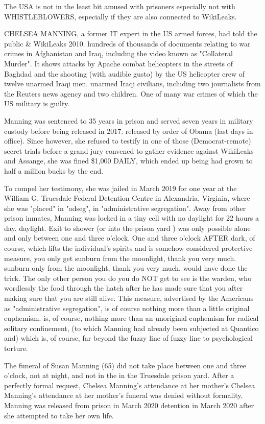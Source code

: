 \begin{multicols}{2}
The USA is not in the least bit amused with prisoners
especially not with WHISTLEBLOWERS, especially if they are also connected to WikiLeaks.

CHELSEA MANNING, a former IT expert in the US armed forces, had told the public \& WikiLeaks 2010.
hundreds of thousands of documents relating to war crimes in
Afghanistan and Iraq, including the video known as "Collateral Murder". It shows attacks by Apache combat helicopters
in the streets of Baghdad and the shooting (with audible gusto) by the US helicopter crew of twelve unarmed Iraqi men.
unarmed Iraqi civilians, including two journalists from the Reuters news agency and two children. One of many war crimes of which the US military is guilty.

Manning was sentenced to 35 years in prison and served seven years in military custody before being released in 2017.
released by order of Obama (last days in office). Since
however, she refused to testify in one of those (Democrat-remote) secret trials before a grand jury convened to gather evidence against WikiLeaks and Assange, she was fined \$1,000 DAILY, which ended up being
had grown to half a million bucks by the end.

To compel her testimony, she was jailed in March 2019
for one year at the William G. Truesdale Federal Detention
Centre in Alexandria, Virginia,
where she was "placed" in "adseg", in "administrative segregation". Away from other prison inmates,
Manning was locked in a tiny cell with no daylight for 22 hours a day.
daylight. Exit to shower (or
into the prison yard ) was only possible alone and only between
one and three o'clock. One and three o'clock AFTER dark, of course,
which lifts the individual's spirits and is somehow considered
protective measure, you only get sunburn from the moonlight, thank you very much.
sunburn only from the moonlight, thank you very much.
would have done the trick. The only other person you do
you do NOT get to see is the warden, who wordlessly
the food through the hatch after he has made sure that you
after making sure that you are still alive.
This measure, advertised by the Americans as "administrative segregation", is of course nothing more than a little original euphemism.
is, of course, nothing more than an unoriginal euphemism for radical solitary confinement, (to which Manning had already been subjected at Quantico and) which is, of course, far beyond the fuzzy line of
fuzzy line to psychological torture.

The funeral of Susan Manning (65) did not take place
between one and three o'clock, not at night, and not in the
in the Truesdale prison yard. After a perfectly formal request, Chelsea Manning's attendance at her mother's
Chelsea Manning's attendance at her mother's funeral was denied without formality. Manning was released from prison in March 2020
detention in March 2020 after she attempted to take her own life.


\end{multicols}
